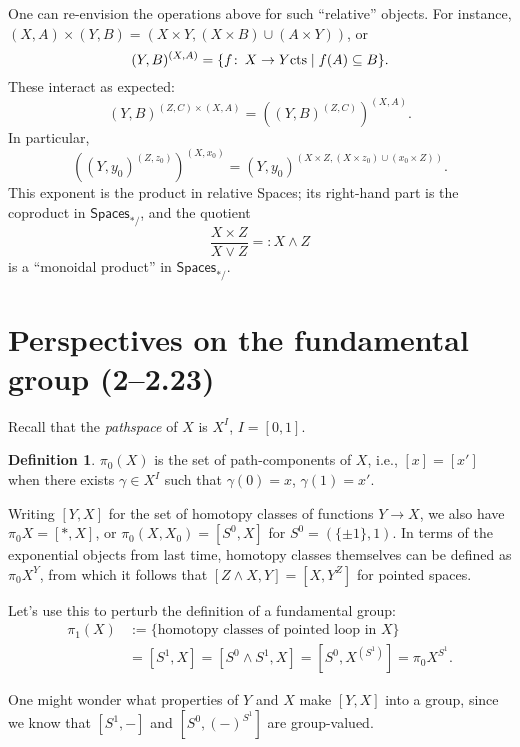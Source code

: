 \documentclass{amsart}
\newcommand{\CatOf}[1]{\mathsf{#1}}
\newcommand{\define}[1]{\textit{#1}}
\newcommand{\co}{\colon\thinspace}
\newcommand{\sm}{\wedge}
\theoremstyle{plain}
\theoremstyle{definition}
\newtheorem{definition}[dummy]{Definition}
\theoremstyle{remark}
\begin{document}
One can re-envision the operations above for such ``relative'' objects.  For instance, $(X, A) \times (Y, B) = (X \times Y, (X \times B) \cup (A \times Y))$, or \[(Y, B)^{(X, A)} = \{f \co X \to Y \text{cts} \mid f(A) \subseteq B\}.\]  These interact as expected: \[(Y, B)^{(Z, C) \times (X, A)} = \left((Y, B)^{(Z, C)}\right)^{(X, A)}.\]  In particular, \[\left((Y, y_0)^{(Z, z_0)}\right)^{(X, x_0)} = (Y, y_0)^{(X \times Z, (X \times z_0) \cup (x_0 \times Z))}.\]  This exponent is the product in relative Spaces; its right-hand part is the coproduct in $\CatOf{Spaces}_{*/}$, and the quotient \[\frac{X \times Z}{X \vee Z} =: X \sm Z\] is a ``monoidal product'' in $\CatOf{Spaces}_{*/}$.




\section{Perspectives on the fundamental group (2--2.23)}

Recall that the \define{pathspace} of $X$ is $X^I$, $I = [0, 1]$.

\begin{definition}
$\pi_0(X)$ is the set of path-components of $X$, i.e., $[x] = [x']$ when there exists $\gamma \in X^I$ such that $\gamma(0) = x$, $\gamma(1) = x'$.
\end{definition}

Writing $[Y, X]$ for the set of homotopy classes of functions $Y \to X$, we also have $\pi_0 X = [*, X]$, or $\pi_0(X, X_0) = [S^0, X]$ for $S^0 = (\{\pm 1\}, 1)$.  In terms of the exponential objects from last time, homotopy classes themselves can be defined as $\pi_0 X^Y$, from which it follows that $[Z \sm X, Y] = [X, Y^Z]$ for pointed spaces.

Let's use this to perturb the definition of a fundamental group:
\begin{align*}
\pi_1(X) & := \{\text{homotopy classes of pointed loop in $X$}\} \\
& = [S^1, X] = [S^0 \sm S^1, X] = [S^0, X^{(S^1)}] = \pi_0 X^{S^1}.
\end{align*}

One might wonder what properties of $Y$ and $X$ make $[Y, X]$ into a group, since we know that $[S^1, -]$ and $[S^0, (-)^{S^1}]$ are group-valued.
\end{document}
